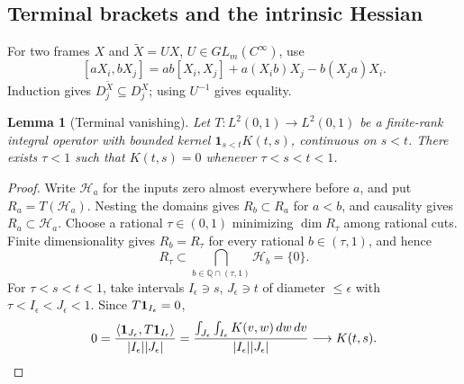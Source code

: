 \documentclass[11pt,letterpaper]{article}
\newcounter{proofgroup}
\newcommand{\proofsection}[1]{\stepcounter{proofgroup}\subsection{#1}}
\newtheorem{lemma}[theorem]{Lemma}
\begin{document}
\proofsection{Terminal brackets and the intrinsic Hessian}\label{brackets}

For two frames $X$ and $\widetilde X=UX$, $U\in GL_m(C^\infty)$, use
\[
 [aX_i,bX_j]=ab[X_i,X_j]+a(X_ib)X_j-b(X_ja)X_i .
\]
Induction gives $D_j^{\widetilde X}\subseteq D_j^X$; using $U^{-1}$ gives equality.
\begin{lemma}[Terminal vanishing]\label{causal}
Let $T:L^2(0,1)\to L^2(0,1)$ be a finite-rank integral operator
with bounded kernel $\mathbf1_{s<t}K(t,s)$, continuous on $s<t$.
There exists $\tau<1$ such that $K(t,s)=0$ whenever $\tau<s<t<1$.
\end{lemma}
\begin{proof}
Write $\mathcal H_a$ for the inputs zero almost everywhere before $a$,
and put $R_a=T(\mathcal H_a)$. Nesting the domains gives
$R_b\subset R_a$ for $a<b$, and causality gives $R_a\subset\mathcal H_a$.
Choose a rational $\tau\in(0,1)$ minimizing $\dim R_\tau$ among
rational cuts. Finite dimensionality gives $R_b=R_\tau$ for every
rational $b\in(\tau,1)$, and hence
\begin{equation}\label{tail-rank}
 R_\tau\subset\bigcap_{b\in\mathbb Q\cap(\tau,1)}\mathcal H_b=\{0\}.
\end{equation}
For $\tau<s<t<1$, take intervals $I_\epsilon\ni s$, $J_\epsilon\ni t$
of diameter $\le\epsilon$ with $\tau<I_\epsilon<J_\epsilon<1$. Since
$T{\bf1}_{I_\epsilon}=0$,
\[
 0=\frac{\langle{\bf1}_{J_\epsilon},T{\bf1}_{I_\epsilon}\rangle}
          {|I_\epsilon||J_\epsilon|}
 =\frac{\int_{J_\epsilon}\int_{I_\epsilon}K(v,w)\,dw\,dv}
        {|I_\epsilon||J_\epsilon|}\longrightarrow K(t,s).
\]
\end{proof}
\end{document}
